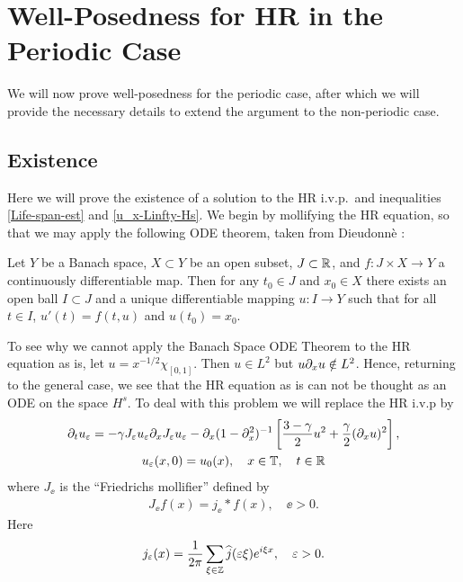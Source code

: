 \section{Well-Posedness for HR in the Periodic Case}
%
%
%
%
We will now prove well-posedness for the periodic case, after which we will
provide the necessary details to extend the argument to the non-periodic case.
\subsection{Existence}
\label{existence}
Here we will prove the existence of a solution to the HR i.v.p.\
and inequalities
\eqref{Life-span-est} and \eqref{u_x-Linfty-Hs}.  We begin by mollifying the HR equation, so that we may apply the following ODE
theorem, taken from Dieudonn\`e \cite{Dieudonne:1969}: 
%
\begin{theorem}
\label{ode_theorem}
Let  $Y$  be a Banach space, $X\subset Y$ be an open subset,
$J \subset \mathbb{R}$, and $f: J \times X\to Y$ a continuously differentiable
map.  Then for any $t_{0} \in J$ and $x_{0} \in X$ there exists an
open ball $I \subset J$ and a unique differentiable mapping $u:I
\to Y$ such that for all $t \in I$,  $u'(t) = f(t, u)$
and $u(t_{0}) = x_{0}$.
\end{theorem}
%
To see why we cannot apply the Banach Space ODE Theorem to the HR equation as
is, let $u=x^{-1/2} \chi_{[0,1]}$. Then $u
\in L^{2}$ but $u\partial_x u \notin L^{2}$. Hence, returning to the general case, we see
that the HR equation as is can not be thought as an ODE on the space $H^s$. To
deal with this problem we will replace the HR i.v.p by  
\begin{gather}
\label{hr-moli}
\partial_t  u_\varepsilon =
-\gamma J_\varepsilon u_\varepsilon \partial_x  J_\varepsilon  u_\varepsilon - \partial_x (1-\partial_x^2)^{-1} 
\left[\frac{3-\gamma}{2}u^2 + \frac{\gamma}{2}(\partial_x u)^2 \right],
\\
\label{hr-moli-data} 
u_\varepsilon(x, 0) = u_0 (x), \quad x \in \mathbb{T}, \quad t \in \mathbb{R}
\end{gather}
%
where $J_\ee$ is the ``Friedrichs mollifier''
defined by 
\begin{equation}
\label{0'u}
\begin{split}
J_\ee f(x) = j_\ee * f(x), \quad \ee>0.
\end{split}
\end{equation}
%
%
Here
\begin{equation}
\begin{split}
j_\varepsilon (x) = \frac{1}{2 \pi}\sum_{\xi \in \mathbb{Z}}
\widehat{j}(\varepsilon \xi) e^{i \xi x}, \quad \varepsilon > 0.
\label{parseval-def}
\end{split}
\end{equation}
